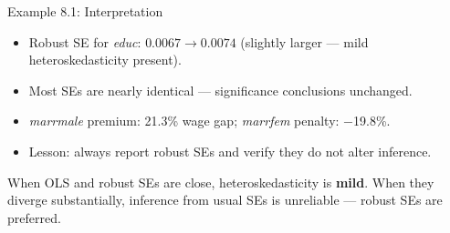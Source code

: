\documentclass[aspectratio=169, 12pt]{beamer}
\begin{document}
\begin{frame}{Example 8.1: Interpretation}

  \begin{keybox}
    \begin{itemize}
      \item Robust SE for \textit{educ}: $0.0067 \to 0.0074$ (slightly larger — mild heteroskedasticity present).
      \item Most SEs are nearly identical — significance conclusions unchanged.
      \item \textit{marrmale} premium: 21.3\% wage gap; \textit{marrfem} penalty: $-$19.8\%.
      \item Lesson: always report robust SEs and verify they do not alter inference.
    \end{itemize}
  \end{keybox}

  \smallskip

  \begin{highlightbox}
    When OLS and robust SEs are close, heteroskedasticity is \textbf{mild}. When they diverge substantially, inference from usual SEs is unreliable — robust SEs are preferred.
  \end{highlightbox}

\end{frame}
\end{document}
